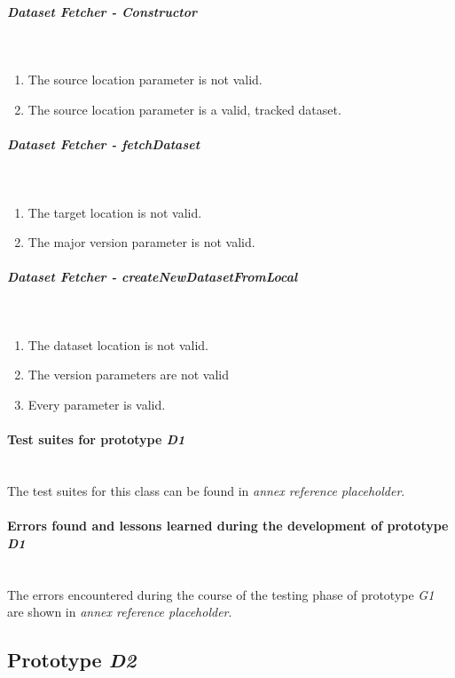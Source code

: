 \subparagraph{Dataset Fetcher - Constructor} \mbox{}\\
\begin{enumerate}
    \item The source location parameter is not valid.
    \item The source location parameter is a valid, tracked dataset.
\end{enumerate}

\subparagraph{Dataset Fetcher - fetchDataset} \mbox{}\\
\begin{enumerate}
    \item The target location is not valid.
    \item The major version parameter is not valid.
\end{enumerate}

\subparagraph{Dataset Fetcher - createNewDatasetFromLocal} \mbox{}\\
\begin{enumerate}
    \item The dataset location is not valid.
    \item The version parameters are not valid
    \item Every parameter is valid.
\end{enumerate}

\paragraph{Test suites for prototype \emph{D1}}\mbox{}\\

The test suites for this class can be found in \emph{annex reference placeholder}. %

\paragraph{Errors found and lessons learned during the development of prototype \emph{D1}}\mbox{}\\

The errors encountered during the course of the testing phase of prototype \emph{G1} are shown in \emph{annex reference placeholder}. %

\subsection{Prototype \emph{D2}}

